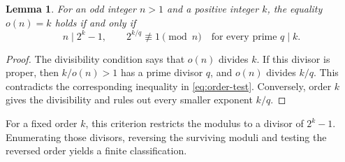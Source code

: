 \documentclass[11pt]{amsart}
\newtheorem{lemma}[theorem]{Lemma}
\theoremstyle{remark}\newtheorem{remark}[theorem]{Remark}
\begin{document}
\begin{lemma}\label{lem:order}
For an odd integer $n>1$ and a positive integer $k$, the equality
$o(n)=k$ holds if and only if
\begin{equation}\label{eq:order-test}
 n\mid 2^k-1,\qquad
 2^{k/q}\not\equiv1\pmod n\quad\text{for every prime }q\mid k.
\end{equation}
\end{lemma}
\begin{proof}
The divisibility condition says that $o(n)$ divides $k$. If this divisor
is proper, then $k/o(n)>1$ has a prime divisor $q$, and $o(n)$ divides
$k/q$. This contradicts the corresponding inequality in
\eqref{eq:order-test}. Conversely, order $k$ gives the divisibility and
rules out every smaller exponent $k/q$.
\end{proof}

For a fixed order $k$, this criterion restricts the modulus to a divisor of $2^k-1$. Enumerating those divisors, reversing the surviving moduli and testing the reversed order yields a finite classification.
\end{document}

